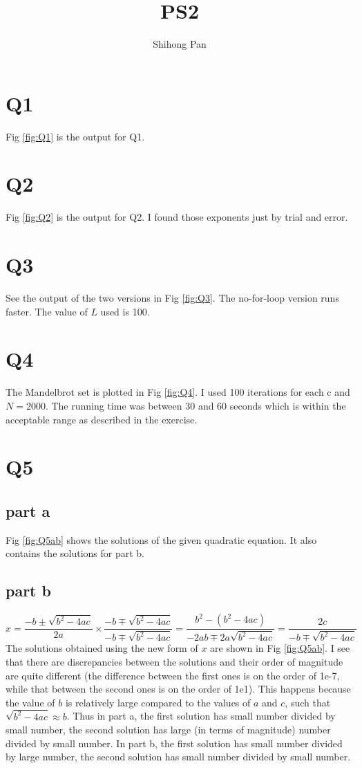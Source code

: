 \documentclass[11pt]{article}
\title{PS2}
\author{Shihong Pan}
\begin{document}
\maketitle

\section{Q1}
Fig \ref{fig:Q1} is the output for Q1. 

\section{Q2}
Fig \ref{fig:Q2} is the output for Q2. I found those exponents just by trial and error.


\section{Q3}
See the output of the two versions in Fig \ref{fig:Q3}. The no-for-loop version runs faster. The value of $L$ used is 100.
  
\section{Q4}
The Mandelbrot set is plotted in Fig \ref{fig:Q4}. I used 100 iterations for each c and $N=2000$. The running time was between 30 and 60 seconds which is within the acceptable range as described in the exercise.

\section{Q5}
\subsection{part a}
Fig \ref{fig:Q5ab} shows the solutions of the given quadratic equation. It also contains the solutions for part b.
\subsection{part b}
\begin{equation}
    x = \frac{-b\pm\sqrt{b^2-4ac}}{2a}\times\frac{-b\mp\sqrt{b^2-4ac}}{-b\mp\sqrt{b^2-4ac}} = \frac{b^2-(b^2-4ac)}{-2ab\mp2a\sqrt{b^2-4ac}}=\frac{2c}{-b\mp\sqrt{b^2-4ac}}
\end{equation}
The solutions obtained using the new form of $x$ are shown in Fig \ref{fig:Q5ab}. I see that there are discrepancies between the solutions and their order of magnitude are quite different (the difference between the first ones is on the order of 1e-7, while that between the second ones is on the order of 1e1). This happens because the value of $b$ is relatively large compared to the values of $a$ and $c$, such that $\sqrt{b^2-4ac}\approx b$. Thus in part a, the first solution has small number divided by small number, the second solution has large (in terms of magnitude) number divided by small number. In part b, the first solution has small number divided by large number, the second solution has small number divided by small number.
\end{document}
